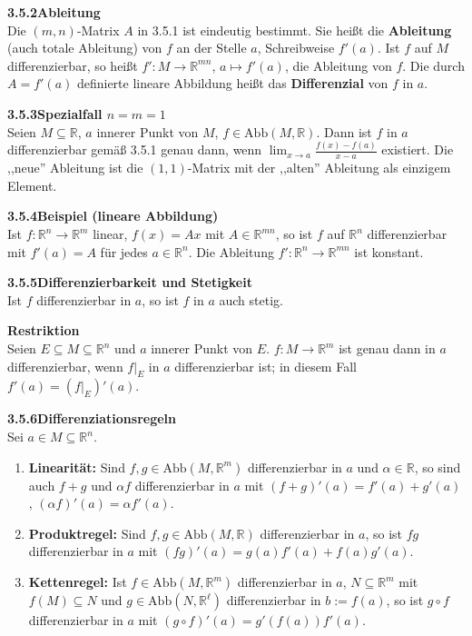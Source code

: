\documentclass[a4paper,12pt]{article}
\newcommand{\gentry}[3]{%
  \noindent\textbf{#1\quad #2}\nopagebreak\\[0.2em]
  #3\par\smallskip
}
\begin{document}
\gentry{3.5.2}{Ableitung}{%
  Die $(m, n)$-Matrix $A$ in 3.5.1 ist eindeutig bestimmt. Sie hei{\ss}t die
  \textbf{Ableitung} (auch totale Ableitung) von $f$ an der Stelle $a$, Schreibweise
  $f'(a)$. Ist $f$ auf $M$ differenzierbar, so hei{\ss}t
  $f' : M \to \mathbb{R}^{mn}$, $a \mapsto f'(a)$, die Ableitung von $f$.
  Die durch $A = f'(a)$ definierte lineare Abbildung hei{\ss}t das \textbf{Differenzial}
  von $f$ in $a$.
}

\gentry{3.5.3}{Spezialfall $n = m = 1$}{%
  Seien $M \subseteq \mathbb{R}$, $a$ innerer Punkt von $M$, $f \in \mathrm{Abb}(M, \mathbb{R})$.
  Dann ist $f$ in $a$ differenzierbar gem\"a{\ss} 3.5.1 genau dann, wenn
  $\lim_{x \to a} \tfrac{f(x) - f(a)}{x - a}$ existiert. Die ,,neue'' Ableitung ist
  die $(1, 1)$-Matrix mit der ,,alten'' Ableitung als einzigem Element.
}

\gentry{3.5.4}{Beispiel (lineare Abbildung)}{%
  Ist $f : \mathbb{R}^n \to \mathbb{R}^m$ linear, $f(x) = Ax$ mit $A \in \mathbb{R}^{mn}$,
  so ist $f$ auf $\mathbb{R}^n$ differenzierbar mit $f'(a) = A$ f\"ur jedes
  $a \in \mathbb{R}^n$. Die Ableitung $f' : \mathbb{R}^n \to \mathbb{R}^{mn}$ ist konstant.
}

\gentry{3.5.5}{Differenzierbarkeit und Stetigkeit}{%
  Ist $f$ differenzierbar in $a$, so ist $f$ in $a$ auch stetig.
}

\gentry{}{Restriktion}{%
  Seien $E \subseteq M \subseteq \mathbb{R}^n$ und $a$ innerer Punkt von $E$.
  $f : M \to \mathbb{R}^m$ ist genau dann in $a$ differenzierbar, wenn $f|_E$ in $a$
  differenzierbar ist; in diesem Fall $f'(a) = (f|_E)'(a)$.
}

\gentry{3.5.6}{Differenziationsregeln}{%
  Sei $a \in M \subseteq \mathbb{R}^n$.
  \begin{enumerate}[label=(\roman*),topsep=2pt,itemsep=1pt]
    \item \textbf{Linearit\"at:} Sind $f, g \in \mathrm{Abb}(M, \mathbb{R}^m)$ differenzierbar
          in $a$ und $\alpha \in \mathbb{R}$, so sind auch $f + g$ und $\alpha f$
          differenzierbar in $a$ mit $(f + g)'(a) = f'(a) + g'(a)$,
          $(\alpha f)'(a) = \alpha f'(a)$.
    \item \textbf{Produktregel:} Sind $f, g \in \mathrm{Abb}(M, \mathbb{R})$ differenzierbar
          in $a$, so ist $fg$ differenzierbar in $a$ mit
          $(f g)'(a) = g(a) f'(a) + f(a) g'(a)$.
    \item \textbf{Kettenregel:} Ist $f \in \mathrm{Abb}(M, \mathbb{R}^m)$ differenzierbar
          in $a$, $N \subseteq \mathbb{R}^m$ mit $f(M) \subseteq N$ und
          $g \in \mathrm{Abb}(N, \mathbb{R}^\ell)$ differenzierbar in $b := f(a)$,
          so ist $g \circ f$ differenzierbar in $a$ mit
          $(g \circ f)'(a) = g'(f(a)) f'(a)$.
  \end{enumerate}
}
\end{document}
